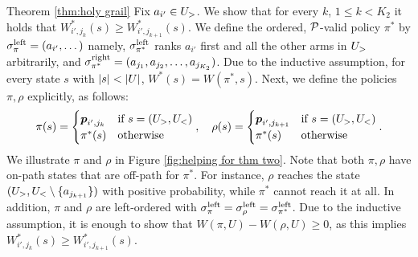 \begin{proofof}{Theorem \ref{thm:holy grail}}
Fix $a_{i'} \in U_>$. We show that for every $k$, $1\leq k<K_2$ it holds that $W^*_{{i'},{j_k}}(s) \geq W^*_{{i'},{j_{k+1}}}(s)$. We define the ordered, $\mathcal{P}$-valid policy $\pi^*$ by $\sigma^{\textnormal{left}}_\pi = (a_{i'},\dots)$  namely, $\sigma^{\textnormal{left}}_{\pi^*}$ ranks $a_{i'}$ first and all the other arms in $U_>$ arbitrarily, and $\sigma^{\textnormal{right}}_{\pi^*}=(a_{j_1},a_{j_2},\dots,a_{j_{K_2}})$. Due to the inductive assumption, for every state $s$ with $\left| s \right|<\left| U \right|$, $W^*(s) = W(\pi^*,s)$. Next, we define the policies $\pi,\rho$ explicitly, as follows:
\[
\pi(s) = 
\begin{cases}
\boldsymbol{ p }_{{i'},{j_k}} & \textnormal{if $s=(U_>,U_<)$} \\
\pi^*(s)& \textnormal{otherwise} 
\end{cases},\quad 
\rho(s) = 
\begin{cases}
\boldsymbol{ p }_{{i'},{j_{k+1}}} & \textnormal{if $s=(U_>,U_<)$} \\
\pi^*(s)& \textnormal{otherwise}
\end{cases}.
\]
We illustrate $\pi$ and $\rho$ in Figure \ref{fig:helping for thm two}. Note that both $\pi,\rho$ have on-path states that are off-path for $\pi^*$. For instance, $\rho$ reaches the state $(U_>,U_<\setminus\{a_{j_{k+1}}\})$ with positive probability, while $\pi^*$ cannot reach it at all. In addition, $\pi$ and $\rho$ are left-ordered with $\sigma^{\textnormal{left}}_\pi=\sigma^{\textnormal{left}}_\rho=\sigma^{\textnormal{left}}_{\pi^*}$. Due to the inductive assumption, it is enough to show that $W(\pi,U)-W(\rho,U)\geq 0$, as this implies $W^*_{{i'},{j_k}}(s) \geq W^*_{{i'},{j_{k+1}}}(s)$.


\end{proofof}
